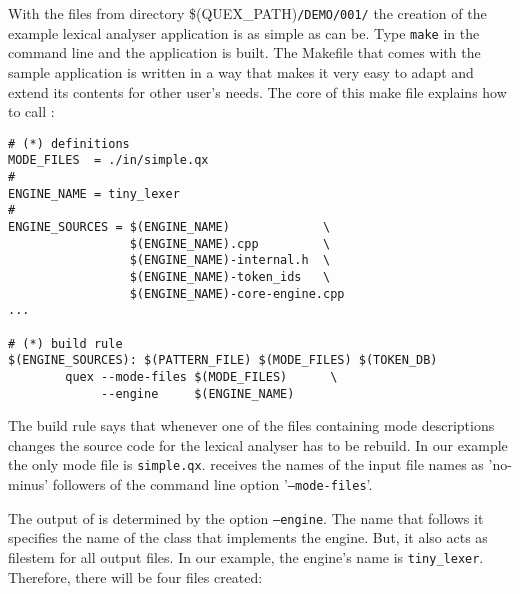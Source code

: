 With the files from directory \$(QUEX\_PATH){\tt /DEMO/001/} the creation of the
example lexical analyser application is as simple as can be. Type {\tt make}
in the command line and the application is built. The Makefile that comes with
the sample application is written in a way that makes it very easy to adapt
and extend its contents for other user's needs. The core of this make file 
explains how to call {\quex}:

\begin{samepage}
\begin{lstlisting}
# (*) definitions
MODE_FILES  = ./in/simple.qx
#
ENGINE_NAME = tiny_lexer
#
ENGINE_SOURCES = $(ENGINE_NAME)             \
                 $(ENGINE_NAME).cpp         \
                 $(ENGINE_NAME)-internal.h  \
                 $(ENGINE_NAME)-token_ids   \
                 $(ENGINE_NAME)-core-engine.cpp
...

# (*) build rule
$(ENGINE_SOURCES): $(PATTERN_FILE) $(MODE_FILES) $(TOKEN_DB)
        quex --mode-files $(MODE_FILES)      \
             --engine     $(ENGINE_NAME)
\end{lstlisting}
\end{samepage}

The build rule says that whenever one of the files containing mode descriptions
changes the source code for the lexical analyser has to be rebuild. In our
example the only mode file is {\tt simple.qx}. {\Quex} receives the names of the 
input file names as 'no-minus' followers of the command line option 
'{\tt --mode-files}'.

The output of {\quex} is determined by the option {\tt --engine}. The name
that follows it specifies the name of the class that implements the engine.
But, it also acts as filestem for all output files. In our example, the
engine's name is {\tt tiny\_lexer}. Therefore, there will be four files
created:

